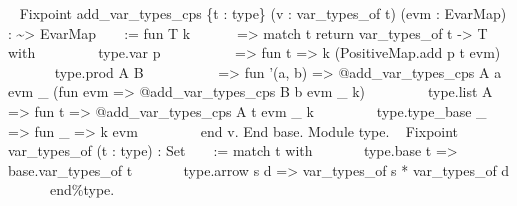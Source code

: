 \begin{itemize}
\begin{itemize}
    ~ Fixpoint add\_var\_types\_cps \{t : type\} (v : var\_types\_of t)
    (evm : EvarMap) : \textasciitilde{}\textgreater{} EvarMap ~ ~ := fun
    T k ~ ~ ~ ~=\textgreater{} match t return var\_types\_of t
    -\textgreater{} T with ~ ~ ~ ~ ~ \textbar{} type.var p ~ ~ ~ ~ ~ ~
    =\textgreater{} fun t =\textgreater{} k (PositiveMap.add p t evm) ~
    ~ ~ ~ ~ \textbar{} type.prod A B ~ ~ ~ ~ ~ ~ =\textgreater{} fun
    '(a, b) =\textgreater{} @add\_var\_types\_cps A a evm \_ (fun evm
    =\textgreater{} @add\_var\_types\_cps B b evm \_ k) ~ ~ ~ ~ ~
    \textbar{} type.list A =\textgreater{} fun t =\textgreater{}
    @add\_var\_types\_cps A t evm \_ k ~ ~ ~ ~ ~ \textbar{}
    type.type\_base \_ =\textgreater{} fun \_ =\textgreater{} k evm ~ ~
    ~ ~ ~ end v. End base. Module type. ~ Fixpoint var\_types\_of (t :
    type) : Set ~ ~ := match t with ~ ~ ~ ~\textbar{} type.base t
    =\textgreater{} base.var\_types\_of t ~ ~ ~ ~\textbar{} type.arrow s
    d =\textgreater{} var\_types\_of s * var\_types\_of d ~ ~ ~
    ~end\%type.


\end{itemize}
\end{itemize}
